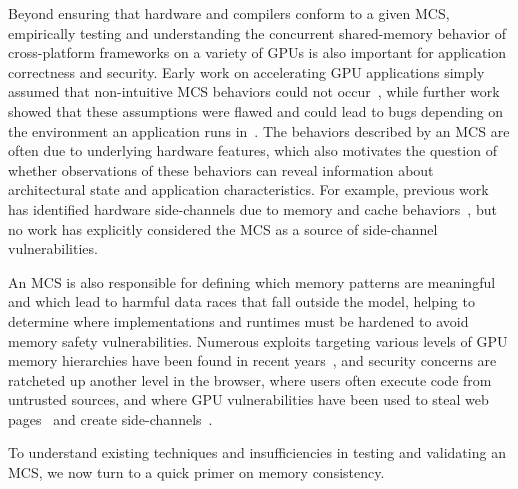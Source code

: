 Beyond ensuring that hardware and compilers conform to a given MCS, empirically testing and understanding the concurrent shared-memory behavior of cross-platform frameworks on a variety of GPUs is also important for application correctness and security. Early work on accelerating GPU applications simply assumed that non-intuitive MCS behaviors could not occur~\cite{xiao2010interblock}, while further work showed that these assumptions were flawed and could lead to bugs depending on the environment an application runs in~\cite{sorensen2016exposing}. The behaviors described by an MCS are often due to underlying hardware features, which also motivates the question of whether observations of these behaviors can reveal information about architectural state and application characteristics. For example, previous work has identified hardware side-channels due to memory and cache behaviors~\cite{jiang2024sync,guo2024usenix,wang2024gpuzip}, but no work has explicitly considered the MCS as a source of side-channel vulnerabilities.

An MCS is also responsible for defining which memory patterns are meaningful and which lead to harmful data races that fall outside the model, helping to determine where implementations and runtimes must be hardened to avoid memory safety vulnerabilities. Numerous exploits targeting various levels of GPU memory hierarchies have been found in recent years~\cite{sorensen2024leftoverlocals,pustelnik2024whispering,dipietro2016cudaleaks,guo2024usenix}, and security concerns are ratcheted up another level in the browser, where users often execute code from untrusted sources, and where GPU vulnerabilities have been used to steal web pages~\cite{lee2014stealing} and create side-channels~\cite{giner2024cacheattack}.

To understand existing techniques and insufficiencies in testing and validating an MCS, we now turn to a quick primer on memory consistency.

\newcommand{\mprlxintrolitmustest}{
    \begingroup
    \tagpdfsetup{table/header-rows={1}}
    \begin{tabular}{l l}
    \midrule
    \multicolumn{1}{c}{\underline{thread 0}} & \multicolumn{1}{c}{\underline{thread 1}} \\
        \introMpEventA\hspace{.1cm} \texttt{store(data, 1)} &  \introMpEventC\hspace{.1cm} \texttt{let r0 = load(flag)}  \\
        \introMpEventB\hspace{.1cm} \texttt{store(flag, 1)} &
        \introMpEventD\hspace{.1cm} \texttt{let r1 = load(data)}  \\
        \midrule
    \end{tabular}
    \endgroup
}

